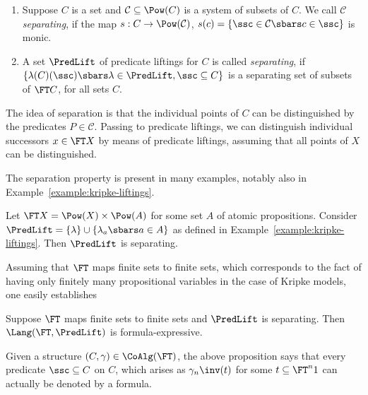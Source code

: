\documentclass{entcs}
\begin{document}
\begin{defn}[Separation]
\begin{enumerate}
\item
  Suppose $C$ is a set and $\mathcal C \subseteq \Pow(C)$ is a system of
  subsets of $C$. We call $\mathcal C$ \emph{separating}, if the map
  $s: C \to \Pow(\mathcal C)$, $s(c) = \lbrace \ssc \in \mathcal C \sbars
  c \in \ssc \rbrace$ is monic.
\item
  A set $\PredLift$ of predicate liftings for $C$ is called \emph{separating},
  if $\lbrace \lambda(C)(\ssc) \sbars \lambda \in \PredLift,
  \ssc \subseteq C \rbrace$ is a separating set of subsets of $\FT C$, for all
  sets $C$.
\end{enumerate}
\end{defn}

The idea of separation is that the individual points of $C$ can be
distinguished by the predicates $P \in \mathcal C$. Passing to predicate
liftings, we can distinguish individual successors $x \in \FT X$ by means of
predicate liftings, assuming that all points of $X$ can be distinguished.

The separation property is present in many examples, notably also in Example~\ref{example:kripke-liftings}.

\begin{example}
Let $\FT X = \Pow(X) \times \Pow(A)$ for some set $A$ of atomic propositions.
Consider $\PredLift = \lbrace \lambda  \rbrace \cup \lbrace \lambda_a \sbars a
\in A \rbrace$ as defined in Example~\ref{example:kripke-liftings}. Then
$\PredLift$ is separating.
\end{example}

Assuming that $\FT$ maps finite sets to finite sets, which corresponds
to the fact of having only finitely many propositional variables in
the case of Kripke models, one easily establishes

\begin{propn} \label{propn:surjection}
  Suppose $\FT$ maps finite sets to finite sets and $\PredLift$ is separating.
        Then $\Lang(\FT,\PredLift)$ is formula-expressive.
\end{propn}

\noindent
Given a structure $(C, \gamma) \in \CoAlg(\FT)$, the above proposition
says that every predicate $\ssc \subseteq C$ on $C$, which arises as
$\gamma_n\inv(t)$ for some $t \subseteq \FT^n 1$ can actually be
denoted by a formula.
\end{document}
